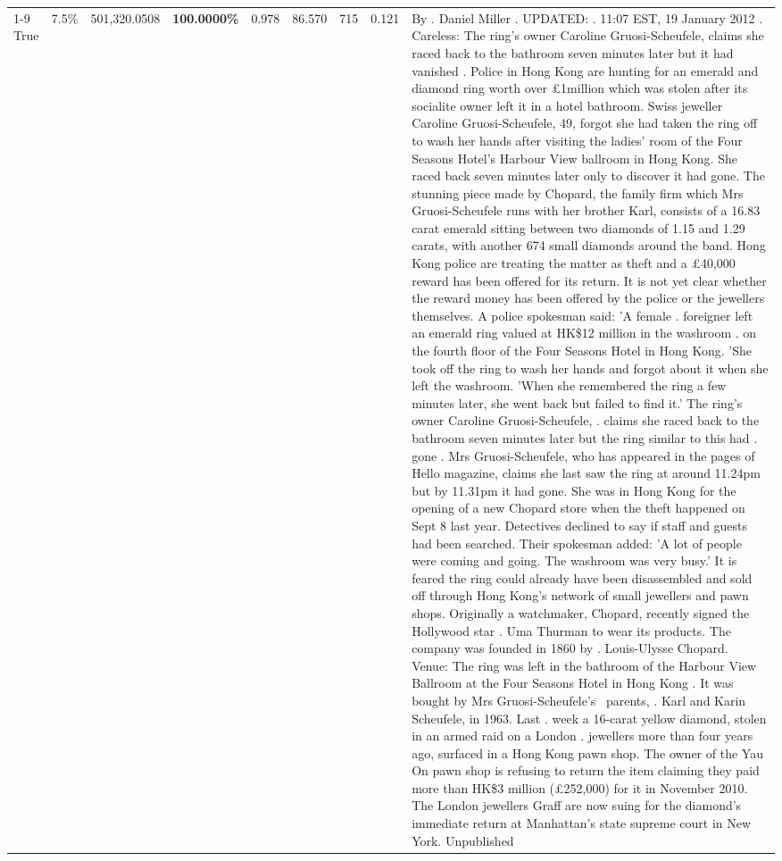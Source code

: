 \begin{table}[H]
\begin{tabular}{lllrlllll}
\cline{1-9} \cline{2-9}
True & 7.5\% & 501,320.0508 & \bfseries \color{red} 100.0000\% & 0.978 & 86.570 & 715 & 0.121 & By . Daniel Miller . UPDATED: . 11:07 EST, 19 January 2012 . Careless: The ring's owner Caroline Gruosi-Scheufele, claims she raced back to the bathroom seven minutes later but it had vanished . Police in Hong Kong are hunting for an emerald and diamond ring worth over £1million which was stolen after its socialite owner left it in a hotel bathroom. Swiss jeweller Caroline Gruosi-Scheufele, 49, forgot she had taken the ring off to wash her hands after visiting the ladies' room of the Four Seasons Hotel's Harbour View ballroom in Hong Kong. She raced back seven minutes later only to discover it had gone. The stunning piece made by Chopard, the family firm which Mrs Gruosi-Scheufele runs with her brother Karl, consists of a 16.83 carat emerald sitting between two diamonds of 1.15 and 1.29 carats, with another 674 small diamonds around the band. Hong Kong police are treating the matter as theft and a £40,000 reward has been offered for its return. It is not yet clear whether the reward money has been offered by the police or the jewellers themselves. A police spokesman said: 'A female . foreigner left an emerald ring valued at HK\$12 million in the washroom . on the fourth floor of the Four Seasons Hotel in Hong Kong. 'She took off the ring to wash her hands and forgot about it when she left the washroom. 'When she remembered the ring a few minutes later, she went back but failed to find it.' The ring's owner Caroline Gruosi-Scheufele, . claims she raced back to the bathroom seven minutes later but the ring similar to this had . gone . Mrs Gruosi-Scheufele, who has appeared in the pages of Hello magazine, claims she last saw the ring at around 11.24pm but by 11.31pm it had gone. She was in Hong Kong for the opening of a new Chopard store when the theft happened on Sept 8 last year. Detectives declined to say if staff and guests had been searched. Their spokesman added: 'A lot of people were coming and going. The washroom was very busy.' It is feared the ring could already have been disassembled and sold off through Hong Kong's network of small jewellers and pawn shops. Originally a watchmaker, Chopard, recently signed the Hollywood star . Uma Thurman to wear its products. The company was founded in 1860 by . Louis-Ulysse Chopard. Venue: The ring was left in the bathroom of the Harbour View Ballroom at the Four Seasons Hotel in Hong Kong . It was bought by Mrs Gruosi-Scheufele's  parents, . Karl and Karin Scheufele, in 1963. Last . week a 16-carat yellow diamond, stolen in an armed raid on a London . jewellers more than four years ago, surfaced in a Hong Kong pawn shop. The owner of the Yau On pawn shop is refusing to return the item claiming they paid more than HK\$3 million (£252,000) for it in November 2010. The London jewellers Graff are now suing for the diamond’s immediate return at Manhattan’s state supreme court in New York. Unpublished \\

\end{tabular}
\end{table}
